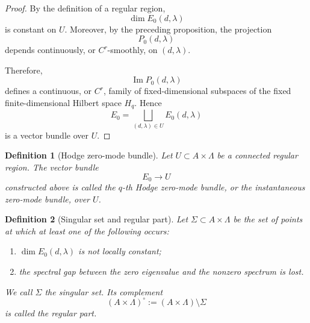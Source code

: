\documentclass[10pt,a4paper]{amsart}
\newtheorem{definition}{Definition}%
\begin{document}
\begin{proof}
By the definition of a regular region,
\[
\dim E_0(d,\lambda)
\]
is constant on \(U\). Moreover, by the preceding proposition, the projection
\[
P_0(d,\lambda)
\]
depends continuously, or \(C^r\)-smoothly, on \((d,\lambda)\).

Therefore,
\[
\operatorname{Im}P_0(d,\lambda)
\]
defines a continuous, or \(C^r\), family of fixed-dimensional subspaces of the
fixed finite-dimensional Hilbert space \(H_q\).
Hence
\[
E_0
=
\bigsqcup_{(d,\lambda)\in U}E_0(d,\lambda)
\]
is a vector bundle over \(U\).
\end{proof}

\begin{definition}[Hodge zero-mode bundle]
Let \(U\subset A\times\Lambda\) be a connected regular region. The vector bundle
\[
E_0\to U
\]
constructed above is called the \emph{\(q\)-th Hodge zero-mode bundle}, or the
\emph{instantaneous zero-mode bundle}, over \(U\).
\end{definition}

\begin{definition}[Singular set and regular part]
Let \(\Sigma\subset A\times\Lambda\) be the set of points at which at least one
of the following occurs:
\begin{enumerate}
    \item \(\dim E_0(d,\lambda)\) is not locally constant;
    \item the spectral gap between the zero eigenvalue and the nonzero spectrum
    is lost.
\end{enumerate}
We call \(\Sigma\) the \emph{singular set}. Its complement
\[
(A\times\Lambda)^\circ
:=
(A\times\Lambda)\setminus\Sigma
\]
is called the \emph{regular part}.
\end{definition}
\end{document}
